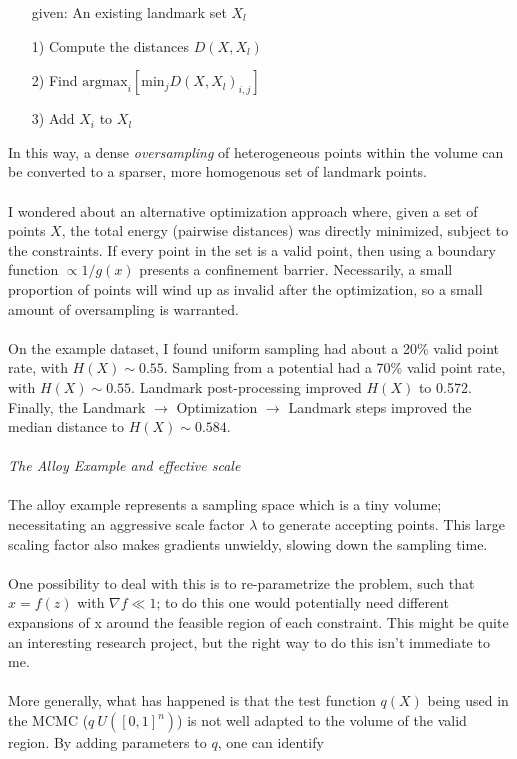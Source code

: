 \documentclass{article}
\begin{document}
\begin{itemize}
\item[given:] An existing landmark set $X_l$
\item[1)] Compute the distances $D(X, X_l)$
\item[2)] Find $\mathrm{argmax}_i[\mathrm{min}_j D(X, X_l)_{i, j}]$
\item[3)] Add $X_i$ to $X_l$
\end{itemize}
In this way, a dense \textit{oversampling} of heterogeneous points within the volume can be converted to a sparser, more homogenous set of landmark points. \\ \\
I wondered about an alternative optimization approach where, given a set of points $X$, the total energy (pairwise distances) was directly minimized, subject to the constraints. If every point in the set is a valid point, then using a boundary function $\propto 1/g(x)$ presents a confinement barrier. Necessarily, a small proportion of points will wind up as invalid after the optimization, so a small amount of oversampling is warranted. \\ \\
On the example dataset, I found uniform sampling had about a 20\% valid point rate, with $H(X) \sim 0.55$. Sampling from a potential had a 70\% valid point rate, with $H(X) \sim 0.55$. Landmark post-processing improved $H(X)$ to 0.572. Finally, the Landmark $\rightarrow$ Optimization $\rightarrow$ Landmark steps improved the median distance to $H(X) \sim 0.584$. \\ \\
\textit{The Alloy Example and effective scale} \\ \\
The alloy example represents a sampling space which is a tiny volume; necessitating an aggressive scale factor $\lambda$ to generate accepting points. This large scaling factor also makes gradients unwieldy, slowing down the sampling time. \\ \\
One possibility to deal with this is to re-parametrize the problem, such that $x = f(z)$ with $\nabla f \ll 1$; to do this one would potentially need different expansions of x around the feasible region of each constraint. This might be quite an interesting research project, but the right way to do this isn't immediate to me.\\ \\
More generally, what has happened is that the test function $q(X)$ being used in the MCMC ($q ~ U([0,1]^n)$) is not well adapted to the volume of the valid region. By adding parameters to $q$, one can identify
\end{document}
